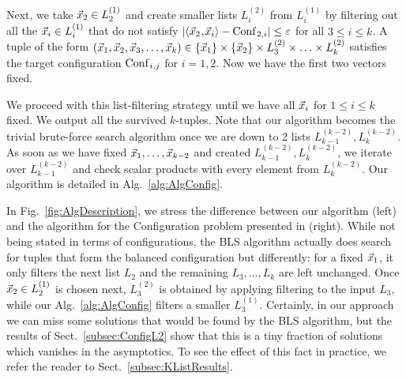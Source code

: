 Next, we take $\vec x_2 \in L_2^{(1)}$ and create smaller lists $L_i^{(2)}$ from $L_i^{(1)}$ by filtering out all the $\vec x_i \in L_i^{(1)}$ that do not satisfy $\left|\langle\vec x_2\!\mathbin{,}\!\vec x_i\rangle - \text{Conf}\mkern2mu_{2,i}\right|  \leq \varepsilon$ for all $3 \leq i \leq k$.
A tuple of the form $(\vec x_1, \vec x_2, \vec x_3, \ldots, \vec x_k) \in \{\vec x_1\} \times \{\vec x_2\} \times L_3^{(2)} \times \ldots \times  L_k^{(2)}$ satisfies the target configuration $\text{Conf}\mkern2mu_{i,j}$ for $i=1,2$. Now we have the first two vectors fixed. 

We proceed with this list-filtering strategy until we have all $\vec x_i$ for $1\le i \le k$ fixed.
We output all the survived $k$-tuples.
Note that our algorithm becomes the trivial brute-force search algorithm once we are down to 2 lists $L_{k-1}^{(k-2)}, L_k^{(k-2)}$.
As soon as we have fixed $\vec x_1,\ldots,\vec x_{k-2}$ and created $L_{k-1}^{(k-2)},L_{k}^{(k-2)}$, we iterate over $L_{k-1}^{(k-2)}$ and check scalar products with every element from $L_{k}^{(k-2)}$. Our algorithm is detailed in Alg.~\ref{alg:AlgConfig}.

In Fig.~\ref{fig:AlgDescription}, we stress the difference between our algorithm (left) and the algorithm for the Configuration problem presented in \cite{BLS16} (right). While not being stated in terms of configurations, the BLS algorithm actually does search for tuples that form the balanced configuration but differently: for a fixed $\vec x_1$, it only filters the next list $L_2$ and the remaining $L_3, \ldots, L_k$ are left unchanged. Once $\vec x_2 \in L_2^{(1)}$ is chosen next, $L_3^{(2)}$ is obtained by applying filtering to the input $L_3$, while our Alg.~\ref{alg:AlgConfig} filters a smaller $L_3^{(1)}$. Certainly, in our approach we can miss some solutions that would be found by the BLS algorithm, but the results of Sect.~\ref{subsec:ConfigL2} show that this is a tiny fraction of solutions which vanishes in the asymptotics. To see the effect of this fact in practice, we refer the reader to Sect.~\ref{subsec:KListResults}.
\clearpage

